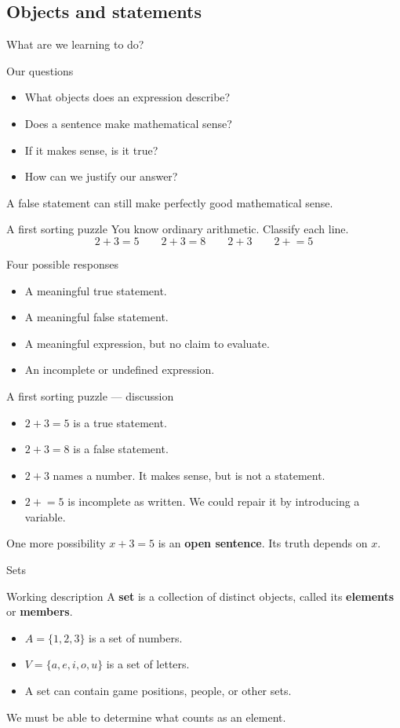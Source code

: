 \documentclass{beamer}
\begin{document}
\subsection{Objects and statements}
\begin{frame}{What are we learning to do?}
\begin{block}{Our questions}
\begin{itemize}
\item What objects does an expression describe?
\item Does a sentence make mathematical sense?
\item If it makes sense, is it true?
\item How can we justify our answer?
\end{itemize}
\end{block}\medskip A false statement can still make perfectly good mathematical sense.
\end{frame}
\begin{frame}{A first sorting puzzle}
You know ordinary arithmetic. Classify each line.\[2+3=5\qquad 2+3=8\qquad 2+3\qquad 2+{}=5\]\begin{block}{Four possible responses}
\begin{itemize}
\item A meaningful true statement.
\item A meaningful false statement.
\item A meaningful expression, but no claim to evaluate.
\item An incomplete or undefined expression.
\end{itemize}
\end{block}
\end{frame}
\begin{frame}{A first sorting puzzle --- discussion}
\begin{itemize}
\item $2+3=5$ is a true statement.
\item $2+3=8$ is a false statement.
\item $2+3$ names a number. It makes sense, but is not a statement.
\item $2+{}=5$ is incomplete as written. We could repair it by introducing a variable.
\end{itemize}\begin{block}{One more possibility}
$x+3=5$ is an \textbf{open sentence}. Its truth depends on $x$.
\end{block}
\end{frame}
\begin{frame}{Sets}
\begin{block}{Working description}
A \textbf{set} is a collection of distinct objects, called its \textbf{elements} or \textbf{members}.
\end{block}\begin{itemize}
\item $A=\{1,2,3\}$ is a set of numbers.
\item $V=\{a,e,i,o,u\}$ is a set of letters.
\item A set can contain game positions, people, or other sets.
\end{itemize}\medskip We must be able to determine what counts as an element.
\end{frame}
\end{document}
